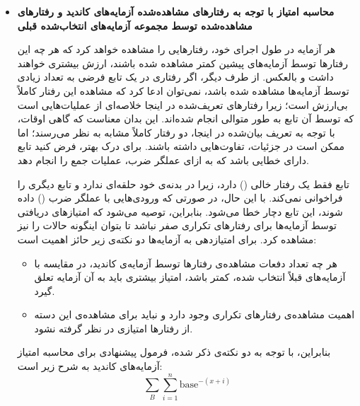 \begin{itemize}
	\item \textbf{محاسبه امتیاز با توجه به رفتارهای مشاهده‌شده آزمایه‌های کاندید و رفتارهای مشاهده‌شده توسط مجموعه آزمایه‌های انتخاب‌شده قبلی}

هر آزمایه در طول اجرای خود، رفتارهایی را مشاهده خواهد کرد که هر چه این رفتارها توسط آزمایه‌های پیشین کمتر مشاهده شده باشند، ارزش بیشتری خواهند داشت و بالعکس. از طرف دیگر، اگر رفتاری در یک تابع فرضی به تعداد زیادی توسط آزمایه‌ها مشاهده شده باشد، نمی‌توان ادعا کرد که مشاهده این رفتار کاملاً بی‌ارزش است؛ زیرا رفتارهای تعریف‌شده در اینجا خلاصه‌ای از عملیات‌هایی است که توسط آن تابع به طور متوالی انجام شده‌اند. این بدان معناست که گاهی اوقات، با توجه به تعریف بیان‌شده در اینجا، دو رفتار کاملاً مشابه به نظر می‌رسند؛ اما ممکن است در جزئیات، تفاوت‌هایی داشته باشند. برای درک بهتر، فرض کنید تابع  دارای خطایی باشد که به ازای عملگر ضرب، عملیات جمع را انجام دهد.

\newpage
\begin{figure}[!h]
	\begin{LTR}
		\singlespacing
		
	\end{LTR}
\end{figure}

تابع  فقط یک رفتار خالی (\lr{[]}) دارد، زیرا در بدنه‌ی خود حلقه‌ای ندارد و تابع دیگری را فراخوانی نمی‌کند. با این حال، در صورتی که ورودی‌هایی با عملگر ضرب (\lr{*}) داده شوند، این تابع دچار خطا می‌شود. بنابراین، توصیه می‌شود که امتیازهای دریافتی توسط آزمایه‌ها برای رفتارهای تکراری صفر نباشد تا بتوان اینگونه حالات را نیز مشاهده کرد.
برای امتیازدهی به آزمایه‌ها دو نکته‌ی زیر حائز اهمیت است:

\begin{itemize}
	\item هر چه تعداد دفعات مشاهده‌ی رفتارها توسط آزمایه‌ی کاندید، در مقایسه با آزمایه‌های قبلاً انتخاب شده، کمتر باشد، امتیاز بیشتری باید به آن آزمایه تعلق گیرد.
	\item اهمیت مشاهده‌ی رفتارهای تکراری وجود دارد و نباید برای مشاهده‌ی این دسته از رفتارها امتیازی در نظر گرفته نشود.
\end{itemize}

بنابراین، با توجه به دو نکته‌ی ذکر شده، فرمول پیشنهادی برای محاسبه امتیاز آزمایه‌های کاندید به شرح زیر است:
\[ \sum_{B} \sum_{i=1}^{n}\text{base}^{-(x+i)} \]


\end{itemize}
